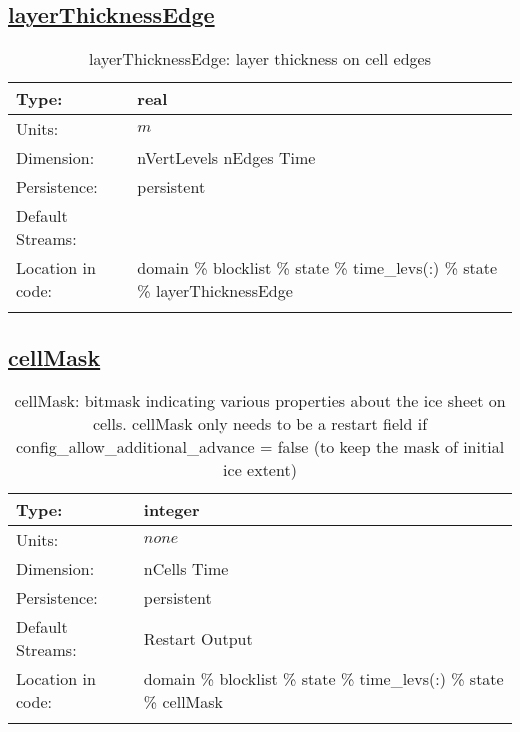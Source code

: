 \subsection[layerThicknessEdge]{\hyperref[sec:var_tab_state]{layerThicknessEdge}}
\label{subsec:var_sec_state_layerThicknessEdge}
\begin{center}
\begin{longtable}{| p{2.0in} | p{4.0in} |}
        \hline 
        Type: & real \\
        \hline 
        Units: & $m$ \\
        \hline 
        Dimension: & nVertLevels nEdges Time \\
        \hline 
        Persistence: & persistent \\
        \hline 
		 Default Streams: &  \\
        \hline 
		 Location in code: & domain \% blocklist \% state \% time\_levs(:) \% state \% layerThicknessEdge \\
		 \hline 
    \caption{layerThicknessEdge: layer thickness on cell edges}
\end{longtable}
\end{center}
\subsection[cellMask]{\hyperref[sec:var_tab_state]{cellMask}}
\label{subsec:var_sec_state_cellMask}
\begin{center}
\begin{longtable}{| p{2.0in} | p{4.0in} |}
        \hline 
        Type: & integer \\
        \hline 
        Units: & $none$ \\
        \hline 
        Dimension: & nCells Time \\
        \hline 
        Persistence: & persistent \\
        \hline 
		 Default Streams: & Restart Output  \\
        \hline 
		 Location in code: & domain \% blocklist \% state \% time\_levs(:) \% state \% cellMask \\
		 \hline 
    \caption{cellMask: bitmask indicating various properties about the ice sheet on cells.  cellMask only needs to be a restart field if config\_allow\_additional\_advance = false (to keep the mask of initial ice extent)}
\end{longtable}
\end{center}
